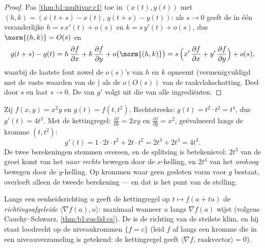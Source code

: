 \begin{proof}
Pas \cref{thm:b1:multivar:c1} toe in $(x(t), y(t))$ met $(h, k) =
(x(t+s) - x(t),\, y(t+s) - y(t))$: als $s \to 0$ geeft de
 in één veranderlijke $h = s\,x'(t) + o(s)$ en $k =
s\,y'(t) + o(s)$, dus $\norm{(h, k)} = O(s)$ en
\[
g(t+s) - g(t)
= h\,\frac{\partial f}{\partial x} + k\,\frac{\partial
f}{\partial y} + o\bigl(\norm{(h,k)}\bigr)
= s\,\Bigl(x'\,\frac{\partial f}{\partial x} +
y'\,\frac{\partial f}{\partial y}\Bigr) + o(s) ,
\]
waarbij de laatste fout zowel de $o(s)$'s van $h$ en $k$ opneemt
(vermenigvuldigd met de vaste waarden van de )
als de $o(O(s))$ van de raakvlakschatting. Deel door $s$ en laat $s
\to 0$. De  van $g'$ volgt uit die van alle
ingrediënten.
\end{proof}

\begin{example}
\label{ex:b1:multivar:chainrun}
Zij $f(x, y) = x^2 y$ en $g(t) = f(t, t^2)$. Rechtstreeks: $g(t) =
t^2\cdot t^2 = t^4$, dus $g'(t) = 4t^3$. Met de kettingregel:
$\frac{\partial f}{\partial x} = 2xy$ en $\frac{\partial
f}{\partial y} = x^2$, geëvalueerd langs de kromme $(t, t^2)$:
\[
g'(t) = 1\cdot 2t\cdot t^2 + 2t\cdot t^2 = 2t^3 + 2t^3 = 4t^3 .
\]
De twee berekeningen stemmen overeen, en de splitsing is
betekenisvol: $2t^3$ van de groei komt van het \emph{naar rechts}
bewegen door de $x$-helling, en $2t^3$ van het \emph{omhoog}
bewegen door de $y$-helling. Op krommen waar geen gesloten vorm
voor $g$ bestaat, overleeft alleen de tweede berekening --- en dat
is het punt van de stelling.
\end{example}

\begin{remark}
Langs een eenheidsrichting $u$ geeft de kettingregel op $t \mapsto
f(a + tu)$ de \emph{richtingsafgeleide} $\langle \nabla f(a),
u\rangle$: maximaal wanneer $u$ langs $\nabla f(a)$ wijst (volgens
Cauchy--Schwarz, \cref{thm:b1:euclid:cs}). De  is de
richting van de steilste klim, en hij staat loodrecht op de
niveaukrommen $\{f = c\}$ (leid $f$ af langs een kromme die in een
niveauverzameling is getekend: de kettingregel geeft
$\langle\nabla f,\, \text{raakvector}\rangle = 0$).
\end{remark}

